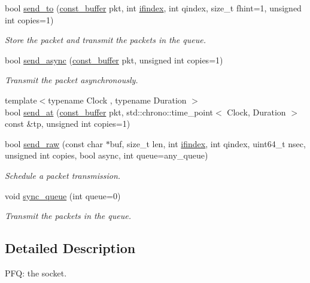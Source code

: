 \begin{DoxyCompactItemize}
bool \hyperlink{classpfq_1_1socket_a3fddba43aa4da1f30fc04cdc3556054a}{send\+\_\+to} (\hyperlink{namespacepfq_ac835a1bd09b4cbaba61c100b50d0a99f}{const\+\_\+buffer} pkt, int \hyperlink{namespacepfq_a251ac5cc269aa123009754edf62ab8b4}{ifindex}, int qindex, size\+\_\+t fhint=1, unsigned int copies=1)
\begin{DoxyCompactList}\small\item\em Store the packet and transmit the packets in the queue. \end{DoxyCompactList}\item 
bool \hyperlink{classpfq_1_1socket_a16f84967f992ee861e5f18d5e29a3275}{send\+\_\+async} (\hyperlink{namespacepfq_ac835a1bd09b4cbaba61c100b50d0a99f}{const\+\_\+buffer} pkt, unsigned int copies=1)
\begin{DoxyCompactList}\small\item\em Transmit the packet asynchronously. \end{DoxyCompactList}\item 
{\footnotesize template$<$typename Clock , typename Duration $>$ }\\bool \hyperlink{classpfq_1_1socket_a730cae7c25a32b22cc79615cbf3f86aa}{send\+\_\+at} (\hyperlink{namespacepfq_ac835a1bd09b4cbaba61c100b50d0a99f}{const\+\_\+buffer} pkt, std\+::chrono\+::time\+\_\+point$<$ Clock, Duration $>$ const \&tp, unsigned int copies=1)
\item 
bool \hyperlink{classpfq_1_1socket_a577512e9c6241ea233c867da14c0e9ae}{send\+\_\+raw} (const char $\ast$buf, size\+\_\+t len, int \hyperlink{namespacepfq_a251ac5cc269aa123009754edf62ab8b4}{ifindex}, int qindex, uint64\+\_\+t nsec, unsigned int copies, bool async, int queue=any\+\_\+queue)
\begin{DoxyCompactList}\small\item\em Schedule a packet transmission. \end{DoxyCompactList}\item 
void \hyperlink{classpfq_1_1socket_ab1739b5779cb85f3e7669883af892828}{sync\+\_\+queue} (int queue=0)
\begin{DoxyCompactList}\small\item\em Transmit the packets in the queue. \end{DoxyCompactList}\end{DoxyCompactItemize}


\subsection{Detailed Description}
P\+FQ\+: the socket. 

